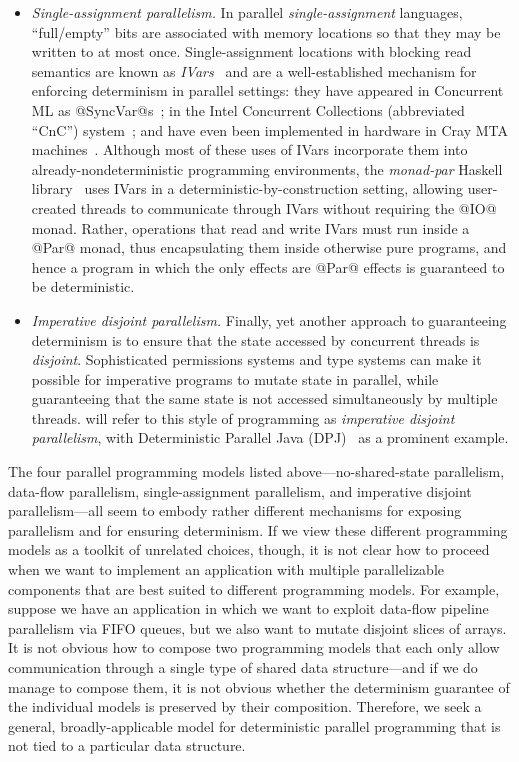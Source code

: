 \begin{itemize}
\item \emph{Single-assignment parallelism.}  In parallel
  \emph{single-assignment} languages, ``full/empty'' bits are
  associated with memory locations so that they may be written to at
  most once. Single-assignment locations with blocking read semantics
  are known as \emph{IVars}~\cite{IStructures} and are a
  well-established mechanism for enforcing determinism in parallel
  settings: they have appeared in Concurrent ML as
  @SyncVar@s~\cite{reppy-cml-book}; in the Intel Concurrent
  Collections (abbreviated ``CnC'') system~\cite{CnC}; and have even
  been implemented in hardware in Cray MTA machines~\cite{cray-mta}.
  Although most of these uses of IVars incorporate them into
  already-nondeterministic programming environments, the
  \emph{monad-par} Haskell library~\cite{monad-par} uses IVars in a
  deterministic-by-construction setting, allowing user-created threads
  to communicate through IVars without requiring the @IO@ monad.
  Rather, operations that read and write IVars must run inside a @Par@
  monad, thus encapsulating them inside otherwise pure programs, and
  hence a program in which the only effects are @Par@ effects is
  guaranteed to be deterministic.

\item \emph{Imperative disjoint parallelism.}  Finally, yet another
  approach to guaranteeing determinism is to ensure that the state
  accessed by concurrent threads is \emph{disjoint}.  Sophisticated
  permissions systems and type systems can make it possible for imperative
  programs to mutate state in parallel, while guaranteeing that the
  same state is not accessed simultaneously by multiple threads.  
  will refer to this style of programming as \emph{imperative disjoint
    parallelism}, with Deterministic Parallel Java
  (DPJ)~\cite{dpj-oopsla, dpj-hotpar09} as a prominent example.
\end{itemize}
The four parallel programming models listed above---no-shared-state
parallelism, data-flow parallelism, single-assignment parallelism, and
imperative disjoint parallelism---all seem to embody rather different
mechanisms for exposing parallelism and for ensuring determinism.  If
we view these different programming models as a toolkit of unrelated
choices, though, it is not clear how to proceed when we want to
implement an application with multiple parallelizable components that
are best suited to different programming models.  For example, suppose
we have an application in which we want to exploit data-flow pipeline
parallelism via FIFO queues, but we also want to mutate disjoint slices of
arrays.  It is not obvious how to compose two programming models that
each only allow communication through a single type of shared data
structure---and if we do manage to compose them, it is not obvious whether the
determinism guarantee of the individual models is preserved by their
composition.  Therefore, we seek a general, broadly-applicable model
for deterministic parallel programming that is not tied to a
particular data structure.

